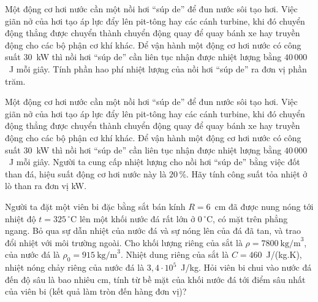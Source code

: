 	\begin{ex}%
		Một động cơ hơi nước cần một nồi hơi ``súp de'' để đun nước sôi tạo hơi. Việc giãn nở của hơi tạo áp lực đẩy lên pit-tông hay các cánh turbine, khi đó chuyển động thẳng được chuyển thành chuyển động quay để quay bánh xe hay truyền động cho các bộ phận cơ khí khác. Để vận hành một động cơ hơi nước có công suất $30$~kW thì nồi hơi ``súp de'' cần liên tục nhận được nhiệt lượng bằng $40\,000$~J mỗi giây. Tính phần hao phí nhiệt lượng của nồi hơi ``súp de'' ra đơn vị phần trăm.
		\par
	\end{ex}

	\begin{ex}%
		Một động cơ hơi nước cần một nồi hơi ``súp de'' để đun nước sôi tạo hơi. Việc giãn nở của hơi tạo áp lực đẩy lên pit-tông hay các cánh turbine, khi đó chuyển động thẳng được chuyển thành chuyển động quay để quay bánh xe hay truyền động cho các bộ phận cơ khí khác. Để vận hành một động cơ hơi nước có công suất $30$~kW thì nồi hơi ``súp de'' cần liên tục nhận được nhiệt lượng bằng $40\,000$~J mỗi giây. Người ta cung cấp nhiệt lượng cho nồi hơi ``súp de'' bằng việc đốt than đá, hiệu suất động cơ hơi nước này là $20\,\%$. Hãy tính công suất tỏa nhiệt ở lò than ra đơn vị kW.
		\par
	\end{ex}

	\begin{ex}%
		Người ta đặt một viên bi đặc bằng sắt bán kính $R=6$~cm đã được nung nóng tới nhiệt độ $t=325\,^\circ\text{C}$ lên một khối nước đá rất lớn ở $0\,^\circ\text{C}$, có mặt trên phẳng ngang. Bỏ qua sự dẫn nhiệt của nước đá và sự nóng lên của đá đã tan, và trao đổi nhiệt với môi trường ngoài. Cho khối lượng riêng của sắt là $\rho=7800~\text{kg/m}^3$, của nước đá là $\rho_0=915~\text{kg/m}^3$. Nhiệt dung riêng của sắt là $C=460$~J/(kg.K), nhiệt nóng chảy riêng của nước đá là $3{,}4\cdot 10^5$~J/kg. Hỏi viên bi chui vào nước đá đến độ sâu là bao nhiêu cm, tính từ bề mặt của khối nước đá tới điểm sâu nhất của viên bi (kết quả làm tròn đến hàng đơn vị)?
		\par
	\end{ex}

